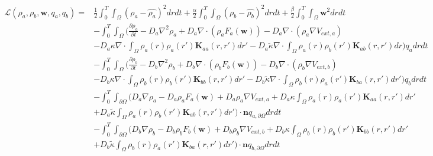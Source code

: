 \documentclass[11pt, a4paper]{article}
\theoremstyle{definition}
\newcommand{\adja}{q_a}
\newcommand{\adjb}{q_b}
\newcommand{\adjaB}{q_{a,\partial \Omega}}
\newcommand{\adjbB}{q_{b,\partial \Omega}}
\newcommand{\ra}{\rho_a}
\newcommand{\rb}{\rho_b}
\newcommand{\w}{\mathbf{w}}
\newcommand{\n}{\mathbf{n}}
\newcommand{\K}{\mathbf{K}}
\begin{document}
	\begin{align*}
	\mathcal{L}(\ra,\rb, \w, \adja, \adjb) =& \frac{1}{2}\int_0^T \int_\Omega ( \ra - \widehat{\ra})^2 dr dt + \frac{\alpha}{2}\int_0^T \int_\Omega ( \rb - \widehat{\rb})^2 dr dt + \frac{\beta}{2}\int_0^T \int_\Omega \w^2 dr dt\\
	& - \int_0^T \int_\Omega \bigg(\frac{\partial \ra}{\partial t} - D_a\nabla^2 \ra + D_a\nabla \cdot(\ra F_a(\w)) - D_a \nabla \cdot (\ra \nabla V_{ext,a})\\
	& - D_a\kappa \nabla \cdot \int_\Omega \ra(r) \ra (r') \K_{aa}(r,r')dr' - D_a\tilde{\kappa} \nabla \cdot \int_\Omega \ra(r) \rb (r') \K_{ab}(r,r')dr\bigg)\adja dr dt \\
	& - \int_0^T \int_\Omega \bigg(
	\frac{\partial \rb}{\partial t} - D_b\nabla^2 \rb + D_b\nabla \cdot(\rb F_b(\w)) - D_b \nabla \cdot (\rb \nabla V_{ext,b}) \\
	&- D_b\kappa \nabla \cdot \int_\Omega \rb(r) \rb (r') \K_{bb}(r,r')dr'
	-  D_b\tilde{\kappa} \nabla \cdot \int_\Omega \rb(r) \ra (r')\K_{ba}(r,r')dr'\bigg) \adjb dr dt\\
	&- \int_0^T \int_{\partial \Omega} \bigg( D_a \nabla \ra - D_a \ra F_a(\w) + D_a \ra \nabla V_{ext,a} + D_a\kappa \int_\Omega \ra(r) \ra (r') \K_{aa}(r,r')dr' \\
	&+  D_a\tilde{\kappa} \int_\Omega \ra(r) \rb (r') \K_{ab}(r,r')dr' \bigg) \cdot \n \adjaB dr dt\\
	& - \int_0^T \int_{\partial \Omega} \bigg( D_b \nabla \rb - D_b \rb F_b(\w) + D_b \rb \nabla V_{ext,b} + D_b\kappa \int_\Omega \rb(r) \rb (r')\K_{bb}(r,r')dr' \\
	&+  D_b\tilde{\kappa} \int_\Omega \rb(r) \ra (r') \K_{ba}(r,r')dr' \bigg) \cdot \n \adjbB dr dt
	\end{align*}
\end{document}
